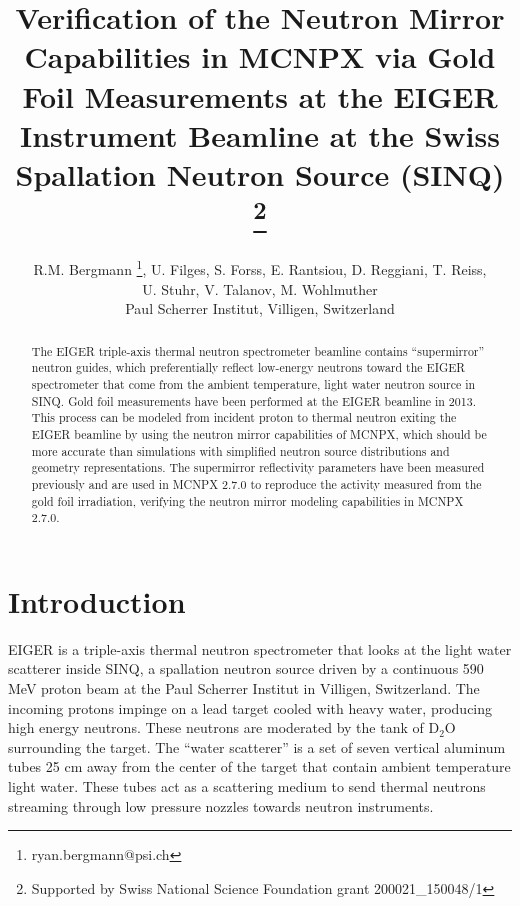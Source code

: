 \documentclass[a4paper,
              ]{jacow}
\begin{document}
\title{Verification of the Neutron Mirror Capabilities in MCNPX via Gold Foil Measurements at the EIGER Instrument Beamline at the Swiss Spallation Neutron Source (SINQ) \thanks{Supported by Swiss National Science Foundation grant 200021\_150048/1} }

\author{R.M. Bergmann \thanks{ryan.bergmann@psi.ch}, U. Filges, S. Forss, E. Rantsiou, D. Reggiani, T. Reiss, \\ U. Stuhr, V. Talanov, M. Wohlmuther \\ Paul Scherrer Institut, Villigen, Switzerland}

\maketitle

%
\begin{abstract}
   The EIGER triple-axis thermal neutron spectrometer beamline contains “supermirror” neutron guides, which preferentially reflect low-energy neutrons toward the EIGER spectrometer that come from the ambient temperature, light water neutron source in SINQ.  Gold foil measurements have been performed at the EIGER beamline in 2013.  This process can be modeled from incident proton to thermal neutron exiting the EIGER beamline by using the neutron mirror capabilities of MCNPX, which should be more accurate than simulations with simplified neutron source distributions and geometry representations.  The supermirror reflectivity parameters have been measured previously and are used in MCNPX 2.7.0 to reproduce the activity measured from the gold foil irradiation, verifying the neutron mirror modeling capabilities in MCNPX 2.7.0.
\end{abstract}


\section{Introduction}

EIGER is a triple-axis thermal neutron spectrometer that looks at the light water scatterer inside SINQ, a spallation neutron source driven by a continuous 590 MeV proton beam at the Paul Scherrer Institut in Villigen, Switzerland.  The incoming protons impinge on a lead target cooled with heavy water, producing high energy neutrons.  These neutrons are moderated by the tank of D$_2$O surrounding the target.  The ``water scatterer'' is a set of seven vertical aluminum tubes 25 cm away from the center of the target that contain ambient temperature light water.  These tubes act as a scattering medium to send thermal neutrons streaming through low pressure nozzles towards neutron instruments.  
\end{document}
